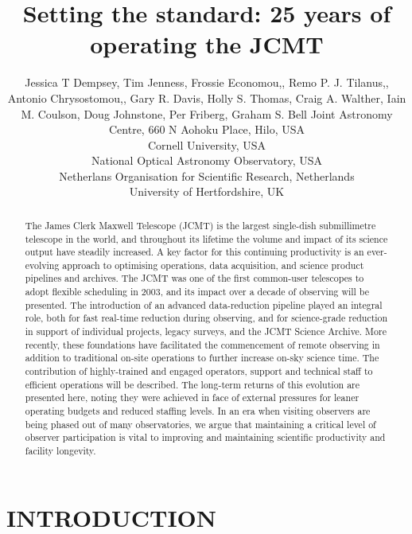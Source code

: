 \documentclass[]{spie}  %
\title{Setting the standard: 25 years of operating the JCMT}
\author{Jessica T Dempsey\supit{a}, Tim Jenness\supit{b}, Frossie Economou,\supit{c}, Remo P. J. Tilanus,\supit{d}, Antonio Chrysostomou,\supit{e}, Gary R. Davis\supit{a}, Holly S. Thomas\supit{a}, Craig A. Walther\supit{a}, Iain M. Coulson\supit{a}, Doug Johnstone\supit{a}, Per Friberg\supit{a}, Graham S. Bell\supit{a}\skiplinehalf
\supit{a}Joint Astronomy Centre, 660 N Aohoku Place, Hilo, USA \\
\supit{b}Cornell University, USA\\
\supit{c} National Optical Astronomy Observatory, USA\\
\supit{d} Netherlans Organisation for Scientific Research, Netherlands\\
\supit{e} University of Hertfordshire, UK\\
}
\begin{document}
  \maketitle

\begin{abstract}
  The James Clerk Maxwell Telescope (JCMT) is the largest single-dish
  submillimetre telescope in the world, and throughout its lifetime
  the volume and impact of its science output have steadily
  increased. A key factor for this continuing productivity is an
  ever-evolving approach to optimising operations, data acquisition,
  and science product pipelines and archives. The JCMT was one of the
  first common-user telescopes to adopt flexible scheduling in 2003,
  and its impact over a decade of observing will be presented.  The
  introduction of an advanced data-reduction pipeline played an
  integral role, both for fast real-time reduction during observing,
  and for science-grade reduction in support of individual projects,
  legacy surveys, and the JCMT Science Archive. More recently, these
  foundations have facilitated the commencement of remote observing in
  addition to traditional on-site operations to further increase
  on-sky science time. The contribution of highly-trained and engaged
  operators, support and technical staff to efficient operations will
  be described. The long-term returns of this evolution are presented
  here, noting they were achieved in face of external pressures for
  leaner operating budgets and reduced staffing levels. In an era when
  visiting observers are being phased out of many observatories, we
  argue that maintaining a critical level of observer participation is
  vital to improving and maintaining scientific productivity and
  facility longevity.
\end{abstract}


\keywords{}

\section{INTRODUCTION}
\label{sec:intro}
\end{document}
